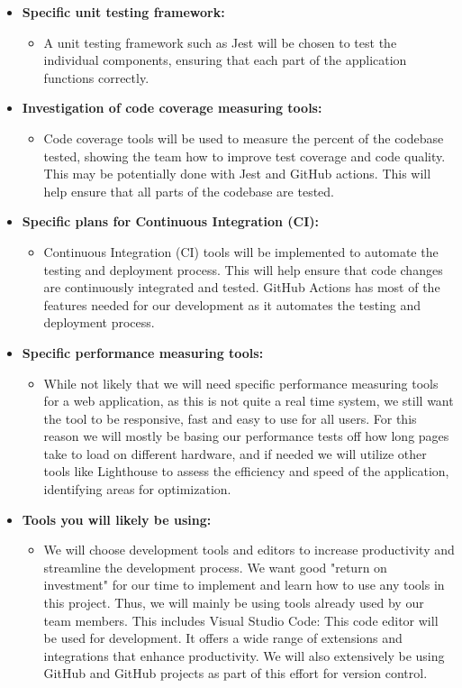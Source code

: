 \documentclass{article}
\begin{document}
\begin{itemize}
  \item \textbf{Specific unit testing framework:}
  \begin{itemize}
    \item  A unit testing framework such as Jest will be chosen to test the individual components, ensuring that each part of the application functions correctly.
  \end{itemize}
  
  \item \textbf{Investigation of code coverage measuring tools:}
  \begin{itemize}
    \item Code coverage tools will be used to measure the percent of the codebase tested, showing the team how to improve test coverage and code quality. This may be potentially done with Jest and GitHub actions. This will help ensure  that all parts of the codebase are tested.
  \end{itemize}
  
  \item \textbf{Specific plans for Continuous Integration (CI):}
  \begin{itemize}
    \item Continuous Integration (CI) tools will be implemented to automate the testing and deployment process. This will help ensure that code changes are continuously integrated and tested. GitHub Actions has most of the features needed for our development as it automates the testing and deployment process.
  \end{itemize}
  
  \item \textbf{Specific performance measuring tools:}
  \begin{itemize}
    \item While not likely that we will need specific performance measuring tools for a web application, as this is not quite a real time system, we still want the tool to be responsive, fast and easy to use for all users. For this reason we will mostly be basing our performance tests off how long pages take to load on different hardware, and if needed we will utilize other tools like Lighthouse to assess the efficiency and speed of the application, identifying areas for optimization.
  \end{itemize}
  
  \item \textbf{Tools you will likely be using:}
  \begin{itemize}
    \item We will choose development tools and editors to increase productivity and streamline the development process. We want good "return on investment" for our time to implement and learn how to use any tools in this project. Thus, we will mainly be using tools already used by our team members. This includes Visual Studio Code: This code editor will be used for development. It offers a wide range of extensions and integrations that enhance productivity. We will also extensively be using GitHub and GitHub projects as part of this effort for version control.
  \end{itemize}
\end{itemize}
\end{document}
